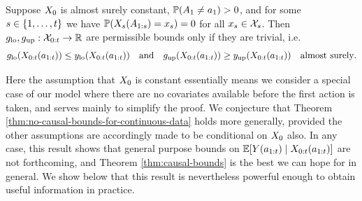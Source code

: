 


\begin{theorem} \label{thm:no-causal-bounds-for-continuous-data}
    Suppose $X_0$ is almost surely constant, $\mathbb{P}(A_1 \neq a_1) > 0$, and for some $s \in \{1, \ldots, t\}$ we have $\mathbb{P}(X_{s}(A_{1:s}) = x_{s}) = 0$ for all $x_{s} \in \mathcal{X}_{s}$.
    Then $g_{\mathrm{lo}}, g_{\mathrm{up}} : \mathcal{X}_{0:t} \to \mathbb{R}$ are permissible bounds only if they are trivial, i.e.\ 
    \begin{align*}
        g_{\mathrm{lo}}(X_{0:t}(a_{1:t})) \leq y_{\mathrm{lo}}(X_{0:t}(a_{1:t})) \quad \textup{and} \quad g_{\mathrm{up}}(X_{0:t}(a_{1:t})) \geq y_{\mathrm{up}}(X_{0:t}(a_{1:t})) \quad \textup{almost surely}.
    \end{align*}
\end{theorem}

Here the assumption that $X_0$ is constant essentially means we consider a special case of our model where there are no covariates available before the first action is taken, and serves mainly to simplify the proof.
We conjecture that Theorem \ref{thm:no-causal-bounds-for-continuous-data} holds more generally, provided the other assumptions are accordingly made to be conditional on $X_0$ also.
In any case, this result shows that general purpose bounds on $\mathbb{E}[Y(a_{1:t}) \mid X_{0:t}(a_{1:t})]$ are not forthcoming, and Theorem \ref{thm:causal-bounds} is the best we can hope for in general.
We show below that this result is nevertheless powerful enough to obtain useful information in practice.

